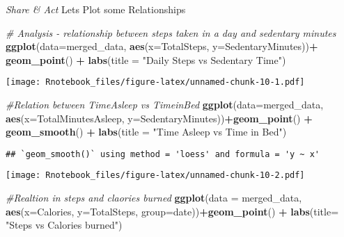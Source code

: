 \documentclass[
]{article}
\newenvironment{Shaded}{\begin{snugshade}}{\end{snugshade}}
\newcommand{\AttributeTok}[1]{\textcolor[rgb]{0.13,0.29,0.53}{#1}}
\newcommand{\CommentTok}[1]{\textcolor[rgb]{0.56,0.35,0.01}{\textit{#1}}}
\newcommand{\FunctionTok}[1]{\textcolor[rgb]{0.13,0.29,0.53}{\textbf{#1}}}
\newcommand{\NormalTok}[1]{#1}
\newcommand{\SpecialCharTok}[1]{\textcolor[rgb]{0.81,0.36,0.00}{\textbf{#1}}}
\newcommand{\StringTok}[1]{\textcolor[rgb]{0.31,0.60,0.02}{#1}}
\begin{document}
\emph{Share \& Act} Lets Plot some Relationships

\begin{Shaded}
\begin{Highlighting}[]
\CommentTok{\# Analysis {-} relationship between steps taken in a day and sedentary minutes}
\FunctionTok{ggplot}\NormalTok{(}\AttributeTok{data=}\NormalTok{merged\_data, }\FunctionTok{aes}\NormalTok{(}\AttributeTok{x=}\NormalTok{TotalSteps, }\AttributeTok{y=}\NormalTok{SedentaryMinutes))}\SpecialCharTok{+} \FunctionTok{geom\_point}\NormalTok{() }\SpecialCharTok{+} 
          \FunctionTok{labs}\NormalTok{(}\AttributeTok{title =} \StringTok{"Daily Steps vs Sedentary Time"}\NormalTok{)}
\end{Highlighting}
\end{Shaded}

\texttt{[image: Rnotebook\_files/figure-latex/unnamed-chunk-10-1.pdf]}

\begin{Shaded}
\begin{Highlighting}[]
\CommentTok{\#Relation between TimeAsleep vs TimeinBed}
\FunctionTok{ggplot}\NormalTok{(}\AttributeTok{data=}\NormalTok{merged\_data, }\FunctionTok{aes}\NormalTok{(}\AttributeTok{x=}\NormalTok{TotalMinutesAsleep, }\AttributeTok{y=}\NormalTok{SedentaryMinutes))}\SpecialCharTok{+}\FunctionTok{geom\_point}\NormalTok{() }\SpecialCharTok{+}
          \FunctionTok{geom\_smooth}\NormalTok{() }\SpecialCharTok{+} \FunctionTok{labs}\NormalTok{(}\AttributeTok{title =} \StringTok{"Time Asleep vs Time in Bed"}\NormalTok{)}
\end{Highlighting}
\end{Shaded}

\begin{verbatim}
## `geom_smooth()` using method = 'loess' and formula = 'y ~ x'
\end{verbatim}

\texttt{[image: Rnotebook\_files/figure-latex/unnamed-chunk-10-2.pdf]}

\begin{Shaded}
\begin{Highlighting}[]
\CommentTok{\#Realtion in steps and claories burned}
\FunctionTok{ggplot}\NormalTok{(}\AttributeTok{data =}\NormalTok{ merged\_data, }\FunctionTok{aes}\NormalTok{(}\AttributeTok{x=}\NormalTok{Calories, }\AttributeTok{y=}\NormalTok{TotalSteps, }\AttributeTok{group=}\NormalTok{date))}\SpecialCharTok{+}\FunctionTok{geom\_point}\NormalTok{() }\SpecialCharTok{+} \FunctionTok{labs}\NormalTok{(}\AttributeTok{title=} \StringTok{"Steps vs Calories burned"}\NormalTok{)}
\end{Highlighting}
\end{Shaded}
\end{document}
